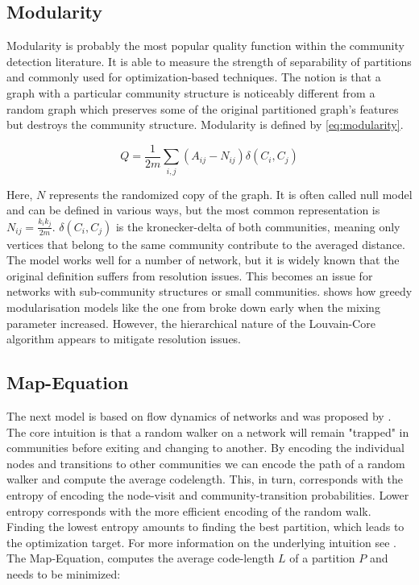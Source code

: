 \documentclass[11pt, twocolumn]{article}
\begin{document}
\subsection{Modularity}
Modularity is probably the most popular quality function within the community detection literature.\cite{fortunato_CommunityDetectionGraphs_2010} It is able to measure the strength of separability of partitions and commonly used for optimization-based techniques. The notion is that a graph with a particular community structure is noticeably different from a random graph which preserves some of the original partitioned graph's features but destroys the community structure. Modularity is defined by \autoref{eq:modularity}.

\begin{equation}
    \label{eq:modularity}
    Q = \frac{1}{2m}\sum_{i,j}(A_{ij}-N_{ij})\delta(C_i,C_j)
\end{equation}

Here, $N$ represents the randomized copy of the graph. It is often called null model and can be defined in various ways, but the most common representation is $N_{ij} = \frac{k_ik_j}{2m}$. $\delta(C_i, C_j)$ is the kronecker-delta of both communities, meaning only vertices that belong to the same community contribute to the averaged distance. The model works well for a number of network, but it is widely known that the original definition suffers from resolution issues. This becomes an issue for networks with sub-community structures or small communities. \citeauthor{lancichinetti_CommunityDetectionAlgorithms_2009} shows how greedy modularisation models like the one from \citeauthor{clauset_FindingCommunityStructure_2004} broke down early when the mixing parameter increased.\cite{lancichinetti_CommunityDetectionAlgorithms_2009} However, the hierarchical nature of the Louvain-Core algorithm appears to mitigate resolution issues. 
\subsection{Map-Equation}
The next model is based on flow dynamics of networks and was proposed by \citeauthor{rosvall_MapEquation_2009}.\cite{rosvall_MapEquation_2009} The core intuition is that a random walker on a network will remain "trapped" in communities before exiting and changing to another. By encoding the individual nodes and transitions to other communities we can encode the path of a random walker and compute the average codelength. This, in turn, corresponds with the entropy of encoding the node-visit and community-transition probabilities. Lower entropy corresponds with the more efficient encoding of the random walk. Finding the lowest entropy amounts to finding the best partition, which leads to the optimization target. For more information on the underlying intuition see \citeauthor{bohlin_CommunityDetectionVisualization_2014}. The Map-Equation, computes the average code-length $L$ of a partition $P$ and needs to be minimized:
\end{document}
